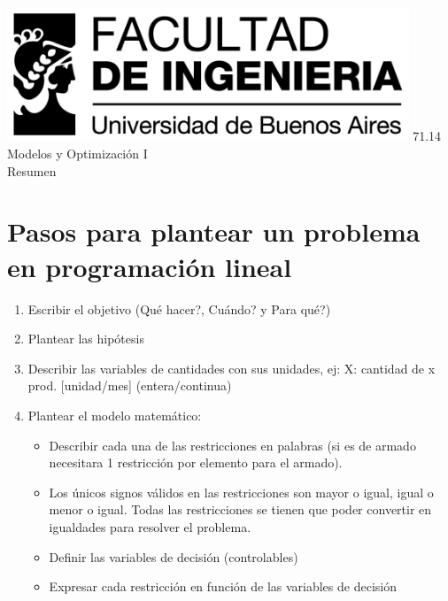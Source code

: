 \documentclass[titlepage,a4paper]{article}
\begin{document}
\begin{titlepage} %
    \includegraphics[width=12cm]{logofiuba.jpg}
    \centering
    \vfill
    \Huge  71.14 Modelos y Optimización I\\
    \vskip1cm
    \Huge 
    Resumen\\
    
    
    \large
    
    
    \vfill



\end{titlepage}

\tableofcontents

\newpage

\section{Pasos para plantear un problema en programación lineal}\label{sec:ej1}

\begin{enumerate}
    \item Escribir el objetivo (Qué hacer?, Cuándo? y Para qué?)
    \item Plantear las hipótesis
    \item Describir las variables de cantidades con sus unidades, ej: X: cantidad de x prod. [unidad/mes] (entera/continua)
    \item Plantear el modelo matemático:
    \begin{itemize}
        \item Describir cada una de las restricciones en palabras (si es de armado necesitara 1 restricción por elemento para el armado).
        \item Los únicos signos válidos en las restricciones son mayor o igual, igual o menor o igual. Todas las restricciones se tienen que poder convertir en igualdades para resolver el problema.
        \item Definir las variables de decisión (controlables)
        \item Expresar cada restricción en función de las variables de decisión
    \end{itemize}
\end{enumerate}
\end{document}
